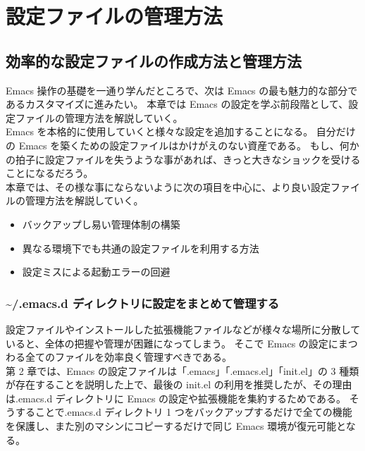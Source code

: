 \chapter{設定ファイルの管理方法}
\section{効率的な設定ファイルの作成方法と管理方法}
Emacs 操作の基礎を一通り学んだところで、次は Emacs の最も魅力的な部分であるカスタマイズに進みたい。
本章では Emacs の設定を学ぶ前段階として、設定ファイルの管理方法を解説していく。\\

Emacs を本格的に使用していくと様々な設定を追加することになる。
自分だけの Emacs を築くための設定ファイルはかけがえのない資産である。
もし、何かの拍子に設定ファイルを失うような事があれば、きっと大きなショックを受けることになるだろう。\\

本章では、その様な事にならないように次の項目を中心に、より良い設定ファイルの管理方法を解説していく。
\begin{itemize}\setlength{\leftskip}{-1.00zw}%
\item バックアップし易い管理体制の構築
\item 異なる環境下でも共通の設定ファイルを利用する方法
\item 設定ミスによる起動エラーの回避
\end{itemize}
\subsection{\textasciitilde/.emacs.d ディレクトリに設定をまとめて管理する}
設定ファイルやインストールした拡張機能ファイルなどが様々な場所に分散していると、全体の把握や管理が困難になってしまう。
そこで  Emacs の設定にまつわる全てのファイルを効率良く管理すべきである。\\

第 2 章では、Emacs の設定ファイルは「.emacs」「.emacs.el」「init.el」の 3 種類が存在することを説明した上で、最後の init.el の利用を推奨したが、その理由は.emacs.d ディレクトリに Emacs の設定や拡張機能を集約するためである。
そうすることで.emacs.d ディレクトリ 1 つをバックアップするだけで全ての機能を保護し、また別のマシンにコピーするだけで同じ Emacs 環境が復元可能となる。
